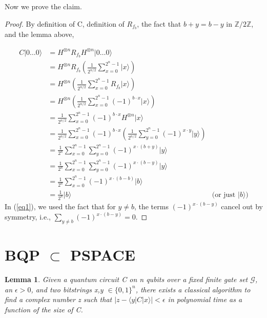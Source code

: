 \documentclass{article}
\newtheorem{lem}[thm]{Lemma}
\newcommand{\ket}[1]{|#1\rangle}
\newcommand{\braket}[2]{\langle#1|#2\rangle}
\begin{document}
Now we prove the claim.
\begin{proof}
    By definition of C, definition of $R_{f_b}$, the fact that $b+y=b-y$ in $\mathbb{Z}/2\mathbb{Z}$, and the lemma above,
    
    \begin{align}
        C\ket{0 \dots 0} &= H^{\otimes n} R_{f_b} H^{\otimes n} \ket{0 \dots 0} \nonumber \\
        &= H^{\otimes n} R_{f_b} (\frac{1}{2^{n/2}} \sum_{x=0}^{2^n-1} \ket{x}) \nonumber \\
        &= H^{\otimes n}  (\frac{1}{2^{n/2}} \sum_{x=0}^{2^n-1} R_{f_b}\ket{x}) \nonumber \\
        &= H^{\otimes n}  (\frac{1}{2^{n/2}} \sum_{x=0}^{2^n-1} (-1)^{b \cdot x}\ket{x}) \nonumber \\
        &= \frac{1}{2^{n/2}} \sum_{x=0}^{2^n-1} (-1)^{b \cdot x} H^{\otimes n}\ket{x} \nonumber \\
        &= \frac{1}{2^{n/2}} \sum_{x=0}^{2^n-1} (-1)^{b \cdot x} (\frac{1}{2^{n/2}} \sum_{y=0}^{2^n-1} (-1)^{x \cdot y} \ket{y}) \nonumber \\
        &= \frac{1}{2^{n}} \sum_{x=0}^{2^n-1}  \sum_{y=0}^{2^n-1} (-1)^{x \cdot (b+y)} \ket{y} \nonumber \\
        &= \frac{1}{2^{n}} \sum_{x=0}^{2^n-1}  \sum_{y=0}^{2^n-1} (-1)^{x \cdot (b-y)} \ket{y} \nonumber \\
        &= \frac{1}{2^{n}} \sum_{x=0}^{2^n-1}  (-1)^{x \cdot (b-b)} \ket{b} \label{eq1} \\ 
        &= \frac{1}{2^n} \ket{b} &\text{(or just $\ket{b}$)} \nonumber 
    \end{align}
    In (\ref{eq1}), we used the fact that for $y\neq b$, the terms $(-1)^{x \cdot (b-y)}$ cancel out by symmetry, i.e., $ \sum_{y \neq b} (-1)^{x \cdot (b-y)}=0$.
\end{proof}

\section{BQP $\subset$ PSPACE}

\begin{lem}
    Given a quantum circuit C on n qubits over a fixed finite gate set $\mathcal{G}$, an $\epsilon >0$, and two bitstrings x,y $\in \{0,1\}^n$, there exists a classical algorithm to find a complex number z such that $|z-\braket{y}{C|x}|<\epsilon$ in polynomial time as a function of the size of C.
\end{lem}
\end{document}
